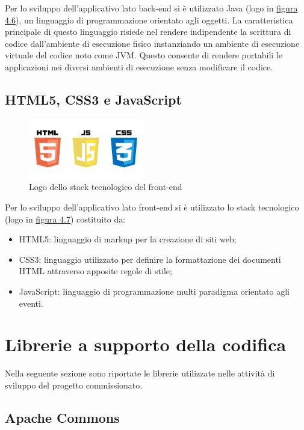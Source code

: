 \noindent Per lo sviluppo dell'applicativo lato back-end si è utilizzato Java (logo in {\hyperref[fig:java]{figura 4.6}}), un linguaggio di programmazione orientato agli oggetti. La caratteristica principale di questo linguaggio risiede nel rendere indipendente la scrittura di codice dall'ambiente di esecuzione fisico instanziando un ambiente di esecuzione virtuale del codice noto come JVM. Questo consente di rendere portabili le applicazioni nei diversi ambienti di esecuzione senza modificare il codice.

\subsection{HTML5, CSS3 e JavaScript}

\begin{figure}[!h]
	\centering
	\includegraphics[width=5cm]{../images/HTML5-logo.png}
	\caption{Logo dello stack tecnologico del front-end}
	\label{fig:frontend}
\end{figure}

\noindent Per lo sviluppo dell'applicativo lato front-end si è utilizzato lo stack tecnologico (logo in {\hyperref[fig:frontend]{figura 4.7}}) costituito da:
\begin{itemize}
\item HTML5: linguaggio di markup per la creazione di siti web;
\item CSS3: linguaggio utilizzato per definire la formattazione dei documenti HTML attraverso apposite regole di stile;
\item JavaScript: linguaggio di programmazione multi paradigma orientato agli eventi.
\end{itemize}

\section{Librerie a supporto della codifica}
Nella seguente sezione sono riportate le librerie utilizzate nelle attività di sviluppo del progetto commissionato. 

\subsection{Apache Commons}

